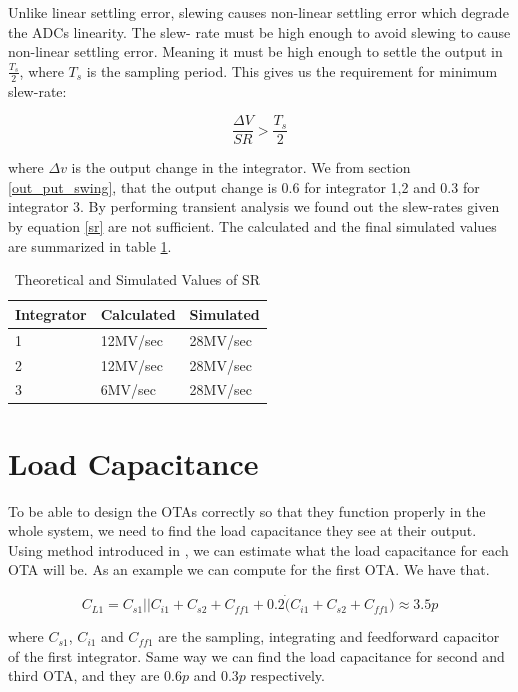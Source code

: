 Unlike linear settling error, slewing causes non-linear settling error which degrade the ADCs linearity. The slew- rate must be high enough to avoid slewing to cause non-linear settling error. Meaning it must be high enough to settle the output in $\frac{T_s}{2}$, where $T_s$ is the sampling period. This gives us the requirement for minimum slew-rate:

\begin{equation}\label{sr}
    \frac{\Delta V}{SR} > \frac{T_s}{2}
\end{equation}

where $\Delta v$ is the output change in the integrator. We from section \ref{out_put_swing}, that the output change is 0.6 for integrator 1,2 and 0.3 for integrator 3. By performing transient analysis we found out the slew-rates given by equation \ref{sr} are not sufficient. The calculated and the final simulated values are summarized in table \ref{SR_final}.

\begin{table}[H]
\centering
\caption{Theoretical and Simulated Values of SR}
\label{SR_final}
\begin{tabular}{|l|l|l|}
\hline
Integrator & Calculated & Simulated \\ \hline
1           & 12MV/sec   & 28MV/sec  \\ \hline
2           & 12MV/sec   & 28MV/sec  \\ \hline
3           & 6MV/sec    & 28MV/sec  \\ \hline
\end{tabular}
\end{table}

\section{Load Capacitance}
To be able to design the OTAs correctly so that they function properly in the whole system, we need to find the load capacitance they see at their output. Using method introduced in \cite{load}, we can estimate what the load capacitance for each OTA will be. As an example we can compute for the first OTA. We have that.

\begin{equation}\label{cap_load}
    C_{L1} = C_{s1}||C_{i1} + C_{s2} + C_{ff1} + 0.2\dot(C_{i1} + C_{s2} + C_{ff1}) \approx 3.5p 
\end{equation}

where $C_{s1}$, $C_{i1}$ and $C_{ff1}$ are the sampling, integrating and feedforward capacitor of the first integrator. Same way we can find the load capacitance for second and third OTA, and they are $0.6p$ and $0.3p$ respectively. 


